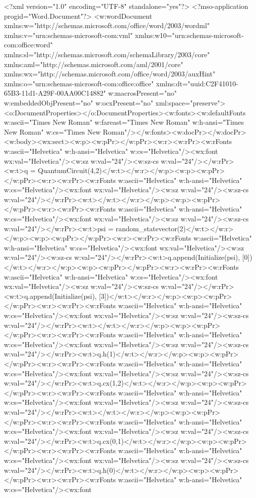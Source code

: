 <?xml version="1.0" encoding="UTF-8" standalone="yes"?>
<?mso-application progid="Word.Document"?>
<w:wordDocument xmlns:w="http://schemas.microsoft.com/office/word/2003/wordml" xmlns:v="urn:schemas-microsoft-com:vml" xmlns:w10="urn:schemas-microsoft-com:office:word" xmlns:sl="http://schemas.microsoft.com/schemaLibrary/2003/core" xmlns:aml="http://schemas.microsoft.com/aml/2001/core" xmlns:wx="http://schemas.microsoft.com/office/word/2003/auxHint" xmlns:o="urn:schemas-microsoft-com:office:office" xmlns:dt="uuid:C2F41010-65B3-11d1-A29F-00AA00C14882" w:macrosPresent="no" w:embeddedObjPresent="no" w:ocxPresent="no" xml:space="preserve"><o:DocumentProperties></o:DocumentProperties><w:fonts><w:defaultFonts w:ascii="Times New Roman" w:fareast="Times New Roman" w:h-ansi="Times New Roman" w:cs="Times New Roman"/></w:fonts><w:docPr></w:docPr><w:body><wx:sect><w:p><w:pPr></w:pPr><w:r><w:rPr><w:rFonts w:ascii="Helvetica" w:h-ansi="Helvetica" w:cs="Helvetica"/><wx:font wx:val="Helvetica"/><w:sz w:val="24"/><w:sz-cs w:val="24"/></w:rPr><w:t>q = QuantumCircuit(4,2)</w:t></w:r></w:p><w:p><w:pPr></w:pPr><w:r><w:rPr><w:rFonts w:ascii="Helvetica" w:h-ansi="Helvetica" w:cs="Helvetica"/><wx:font wx:val="Helvetica"/><w:sz w:val="24"/><w:sz-cs w:val="24"/></w:rPr><w:t></w:t></w:r></w:p><w:p><w:pPr></w:pPr><w:r><w:rPr><w:rFonts w:ascii="Helvetica" w:h-ansi="Helvetica" w:cs="Helvetica"/><wx:font wx:val="Helvetica"/><w:sz w:val="24"/><w:sz-cs w:val="24"/></w:rPr><w:t>psi = random_statevector(2)</w:t></w:r></w:p><w:p><w:pPr></w:pPr><w:r><w:rPr><w:rFonts w:ascii="Helvetica" w:h-ansi="Helvetica" w:cs="Helvetica"/><wx:font wx:val="Helvetica"/><w:sz w:val="24"/><w:sz-cs w:val="24"/></w:rPr><w:t>q.append(Initialize(psi), [0])</w:t></w:r></w:p><w:p><w:pPr></w:pPr><w:r><w:rPr><w:rFonts w:ascii="Helvetica" w:h-ansi="Helvetica" w:cs="Helvetica"/><wx:font wx:val="Helvetica"/><w:sz w:val="24"/><w:sz-cs w:val="24"/></w:rPr><w:t>q.append(Initialize(psi), [3])</w:t></w:r></w:p><w:p><w:pPr></w:pPr><w:r><w:rPr><w:rFonts w:ascii="Helvetica" w:h-ansi="Helvetica" w:cs="Helvetica"/><wx:font wx:val="Helvetica"/><w:sz w:val="24"/><w:sz-cs w:val="24"/></w:rPr><w:t></w:t></w:r></w:p><w:p><w:pPr></w:pPr><w:r><w:rPr><w:rFonts w:ascii="Helvetica" w:h-ansi="Helvetica" w:cs="Helvetica"/><wx:font wx:val="Helvetica"/><w:sz w:val="24"/><w:sz-cs w:val="24"/></w:rPr><w:t>q.h(1)</w:t></w:r></w:p><w:p><w:pPr></w:pPr><w:r><w:rPr><w:rFonts w:ascii="Helvetica" w:h-ansi="Helvetica" w:cs="Helvetica"/><wx:font wx:val="Helvetica"/><w:sz w:val="24"/><w:sz-cs w:val="24"/></w:rPr><w:t>q.cx(1,2)</w:t></w:r></w:p><w:p><w:pPr></w:pPr><w:r><w:rPr><w:rFonts w:ascii="Helvetica" w:h-ansi="Helvetica" w:cs="Helvetica"/><wx:font wx:val="Helvetica"/><w:sz w:val="24"/><w:sz-cs w:val="24"/></w:rPr><w:t></w:t></w:r></w:p><w:p><w:pPr></w:pPr><w:r><w:rPr><w:rFonts w:ascii="Helvetica" w:h-ansi="Helvetica" w:cs="Helvetica"/><wx:font wx:val="Helvetica"/><w:sz w:val="24"/><w:sz-cs w:val="24"/></w:rPr><w:t>q.cx(0,1)</w:t></w:r></w:p><w:p><w:pPr></w:pPr><w:r><w:rPr><w:rFonts w:ascii="Helvetica" w:h-ansi="Helvetica" w:cs="Helvetica"/><wx:font wx:val="Helvetica"/><w:sz w:val="24"/><w:sz-cs w:val="24"/></w:rPr><w:t>q.h(0)</w:t></w:r></w:p><w:p><w:pPr></w:pPr><w:r><w:rPr><w:rFonts w:ascii="Helvetica" w:h-ansi="Helvetica" w:cs="Helvetica"/><wx:font 